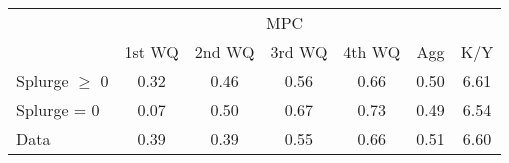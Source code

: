 \begin{tabular}{@{}lcccccc@{}} 
\toprule 
                  & \multicolumn{5}{c}{MPC} &   \\   
                  &  1st WQ  & 2nd WQ  & 3rd WQ & 4th WQ  & Agg  &  K/Y  \\  \midrule 
Splurge $\geq$ 0 &0.32 & 0.46 & 0.56 & 0.66 & 0.50 & 6.61 \\ 
Splurge = 0 &0.07 & 0.50 & 0.67 & 0.73 & 0.49 & 6.54 \\ 
Data &0.39 & 0.39 & 0.55 & 0.66 & 0.51 & 6.60 \\ 
\end{tabular}  

